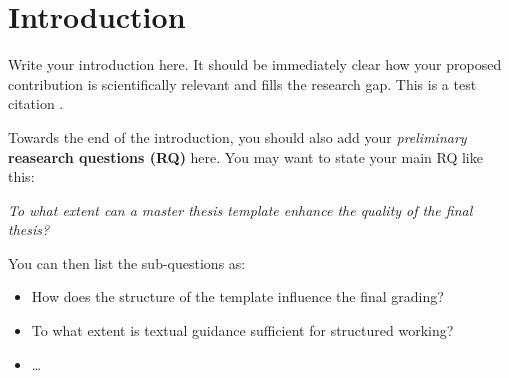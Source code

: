 \section{Introduction}
\label{sec:introduction}
Write your introduction here. It should be immediately clear how your proposed contribution is scientifically relevant and fills the research gap. This is a test citation \cite{Gruber1995}.

Towards the end of the introduction, you should also add your \textit{preliminary} \textbf{reasearch questions (RQ)} here. You may want to state your main RQ like this:

\noindent\textit{To what extent can a master thesis template enhance the quality of the final thesis?}

You can then list the sub-questions as:
\begin{itemize}
    \item How does the structure of the template influence the final grading?
    \item To what extent is textual guidance sufficient for structured working?
    \item \dots
\end{itemize}